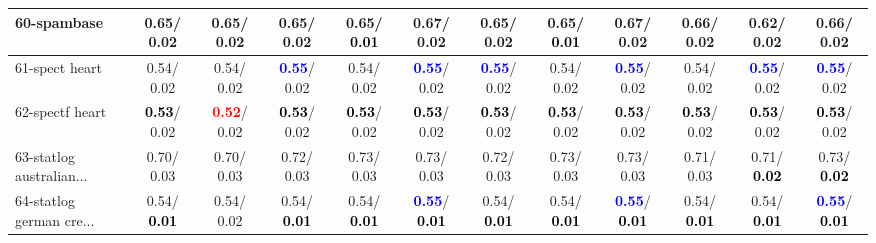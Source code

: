 \begin{table}[h]
\begin{center}
{\begin{tabular}{lc|c|c|c|c|c|c|c|c|c|c}
60-spambase &   0.65/  0.02 &   0.65/  0.02 &   0.65/  0.02 &   0.65/\textcolor{black}{\textbf{  0.01}} &   0.67/  0.02 &   0.65/  0.02 &   0.65/\textcolor{black}{\textbf{  0.01}} &   0.67/  0.02 &   0.66/  0.02 &   0.62/  0.02 &   0.66/  0.02 \\ \hline
61-spect heart &   0.54/  0.02 &   0.54/  0.02 & \textcolor{blue}{\textbf{  0.55}}/  0.02 &   0.54/  0.02 & \textcolor{blue}{\textbf{  0.55}}/  0.02 & \textcolor{blue}{\textbf{  0.55}}/  0.02 &   0.54/  0.02 & \textcolor{blue}{\textbf{  0.55}}/  0.02 &   0.54/  0.02 & \textcolor{blue}{\textbf{  0.55}}/  0.02 & \textcolor{blue}{\textbf{  0.55}}/  0.02 \\
62-spectf heart & \textcolor{black}{\textbf{  0.53}}/  0.02 & \textcolor{red}{\textbf{  0.52}}/  0.02 & \textcolor{black}{\textbf{  0.53}}/  0.02 & \textcolor{black}{\textbf{  0.53}}/  0.02 & \textcolor{black}{\textbf{  0.53}}/  0.02 & \textcolor{black}{\textbf{  0.53}}/  0.02 & \textcolor{black}{\textbf{  0.53}}/  0.02 & \textcolor{black}{\textbf{  0.53}}/  0.02 & \textcolor{black}{\textbf{  0.53}}/  0.02 & \textcolor{black}{\textbf{  0.53}}/  0.02 & \textcolor{black}{\textbf{  0.53}}/  0.02 \\
63-statlog australian... &   0.70/  0.03 &   0.70/  0.03 &   0.72/  0.03 &   0.73/  0.03 &   0.73/  0.03 &   0.72/  0.03 &   0.73/  0.03 &   0.73/  0.03 &   0.71/  0.03 &   0.71/\textcolor{black}{\textbf{  0.02}} &   0.73/\textcolor{black}{\textbf{  0.02}} \\
64-statlog german cre... &   0.54/\textcolor{black}{\textbf{  0.01}} &   0.54/  0.02 &   0.54/\textcolor{black}{\textbf{  0.01}} &   0.54/\textcolor{black}{\textbf{  0.01}} & \textcolor{blue}{\textbf{  0.55}}/\textcolor{black}{\textbf{  0.01}} &   0.54/\textcolor{black}{\textbf{  0.01}} &   0.54/\textcolor{black}{\textbf{  0.01}} & \textcolor{blue}{\textbf{  0.55}}/\textcolor{black}{\textbf{  0.01}} &   0.54/\textcolor{black}{\textbf{  0.01}} &   0.54/\textcolor{black}{\textbf{  0.01}} & \textcolor{blue}{\textbf{  0.55}}/\textcolor{black}{\textbf{  0.01}} \\\end{tabular}
}\label{strats1aCIELM}
\end{center}
\end{table}
